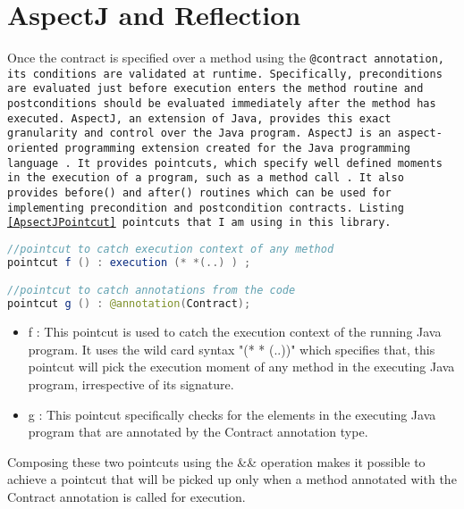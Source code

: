 \section{AspectJ and Reflection}
Once the contract is specified over a method using the \tt{@contract} annotation, its conditions are validated at runtime. Specifically, preconditions are evaluated just before execution enters the method routine and postconditions should be evaluated immediately after the method has executed. AspectJ, an extension of Java, provides this exact granularity and control over the Java program.
AspectJ is an aspect-oriented programming extension created for the Java programming language \cite{AspectJWiki:online}. It provides \tt{pointcuts}, which specify well defined moments in the execution of a program, such as a method call \cite{AspectJWiki:online}. It also provides \tt{before()} and \tt{after()} routines which can be used for implementing precondition and postcondition contracts.
Listing \ref{ApsectJPointcut} pointcuts that I am using in this library. \linebreak

\begin{minipage}{\linewidth}       
\begin{lstlisting}[frame=single, language=Java, caption={Pointcut in AspectJ},label={ApsectJPointcut}, captionpos=b, breaklines=true, showstringspaces=false]
//pointcut to catch execution context of any method
pointcut f () : execution (* *(..) ) ;	

//pointcut to catch annotations from the code
pointcut g () : @annotation(Contract);
\end{lstlisting}
\end{minipage} 

\begin{itemize}
\item f : This pointcut is used to catch the execution context of the running Java program. It uses the wild card syntax "(* * (..))" which specifies that, this pointcut will pick the execution moment of any method in the executing Java program, irrespective of its signature. 

\item g : This pointcut specifically checks for the elements in the executing Java program that are annotated by the Contract annotation type.
\end{itemize}

Composing these two pointcuts using the \&\& operation makes it possible to achieve a pointcut that will be picked up only when a method annotated with the Contract annotation is called for execution. \linebreak

